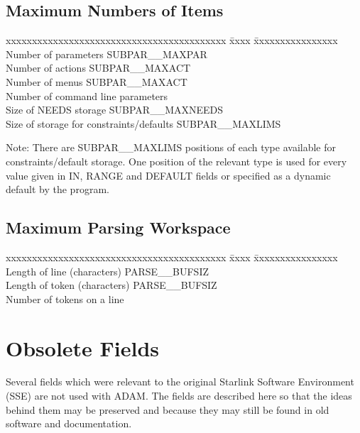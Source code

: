 \documentclass[twoside,11pt,nolof]{starlink}
\begin{document}
\subsection*{Maximum Numbers of Items}
\begin{center}
\begin{tabbing}
xxxxxxxxxxxxxxxxxxxxxxxxxxxxxxxxxxxxxxxxxx \= xxxx \= xxxxxxxxxxxxxxxx \kill
Number of parameters  \> SUBPAR\_\_MAXPAR \\
Number of actions  \> SUBPAR\_\_MAXACT \\
Number of menus  \> SUBPAR\_\_MAXACT \\
Number of command line parameters  \\
Size of NEEDS storage  \> SUBPAR\_\_MAXNEEDS \\
Size of storage for constraints/defaults  \> SUBPAR\_\_MAXLIMS \\
\end{tabbing} \end{center}

Note: There are SUBPAR\_\_MAXLIMS positions of each type available for
constraints/default storage. One position of the relevant type is used
for every value given in IN, RANGE and DEFAULT fields or specified as a dynamic
default by the program.

\subsection*{Maximum Parsing Workspace}
\begin{center}
\begin{tabbing}
xxxxxxxxxxxxxxxxxxxxxxxxxxxxxxxxxxxxxxxxxx \= xxxx \= xxxxxxxxxxxxxxxx \kill
Length of line (characters)  \> PARSE\_\_BUFSIZ \\
Length of token (characters)  \> PARSE\_\_BUFSIZ \\
Number of tokens on a line \\
\end{tabbing} \end{center}

\newpage
\section{Obsolete Fields}

Several fields which were relevant to the original Starlink Software
Environment (SSE) are not used with ADAM.
The fields are described here so that the ideas behind them may be preserved
and because they may still be found in old software and documentation.
\end{document}
